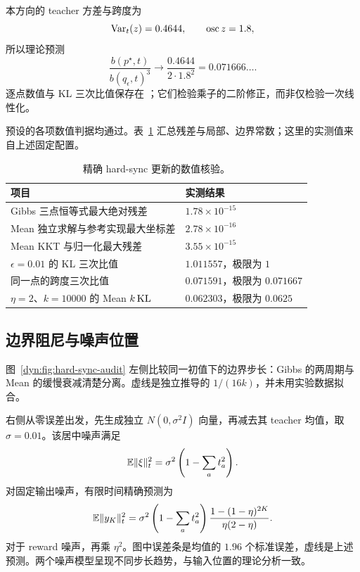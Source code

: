 本方向的 teacher 方差与跨度为
\begin{equation*}
 \operatorname{Var}_t(z)=0.4644,\qquad \operatorname{osc}z=1.8,
\end{equation*}
所以理论预测
\begin{equation*}
 \frac{b(p^\star,t)}{b(q_\epsilon,t)^3}\to
 \frac{0.4644}{2\cdot1.8^2}=0.071666\ldots.
\end{equation*}
逐点数值与 KL 三次比值保存在 ；它们检验乘子的二阶修正，而非仅检验一次线性化。

预设的各项数值判据均通过。表~\ref{dyn:tab:hard-sync-audit} 汇总残差与局部、边界常数；这里的实测值来自上述固定配置。
\begin{table}[htbp]
 \centering
 \caption{精确 hard-sync 更新的数值核验。}
 \label{dyn:tab:hard-sync-audit}
 \begin{tabular}{ll}
 \toprule
 项目 & 实测结果\\
 \midrule
 Gibbs 三点恒等式最大绝对残差 & $1.78\times10^{-15}$\\
 Mean 独立求解与参考实现最大坐标差 & $2.78\times10^{-16}$\\
 Mean KKT 与归一化最大残差 & $3.55\times10^{-15}$\\
 $\epsilon=0.01$ 的 KL 三次比值 & $1.011557$，极限为 $1$\\
 同一点的跨度三次比值 & $0.071591$，极限为 $0.071667$\\
 $\eta=2$、$k=10000$ 的 Mean $k\operatorname{KL}$ & $0.062303$，极限为 $0.0625$\\
 \bottomrule
 \end{tabular}
\end{table}

\subsection{边界阻尼与噪声位置}

图~\ref{dyn:fig:hard-sync-audit} 左侧比较同一初值下的边界步长：Gibbs 的两周期与 Mean 的缓慢衰减清楚分离。虚线是独立推导的 $1/(16k)$，并未用实验数据拟合。

右侧从零误差出发，先生成独立 $N(0,\sigma^2I)$ 向量，再减去其 teacher 均值，取 $\sigma=0.01$。该居中噪声满足
\begin{equation*}
 \mathbb E\|\xi\|_t^2=\sigma^2\left(1-\sum_a t_a^2\right).
\end{equation*}
对固定输出噪声，有限时间精确预测为
\begin{equation*}
 \mathbb E\|y_K\|_t^2=
 \sigma^2\left(1-\sum_a t_a^2\right)
 \frac{1-(1-\eta)^{2K}}{\eta(2-\eta)}.
\end{equation*}
对于 reward 噪声，再乘 $\eta^2$。图中误差条是均值的 $1.96$ 个标准误差，虚线是上述预测。两个噪声模型呈现不同步长趋势，与输入位置的理论分析一致。

